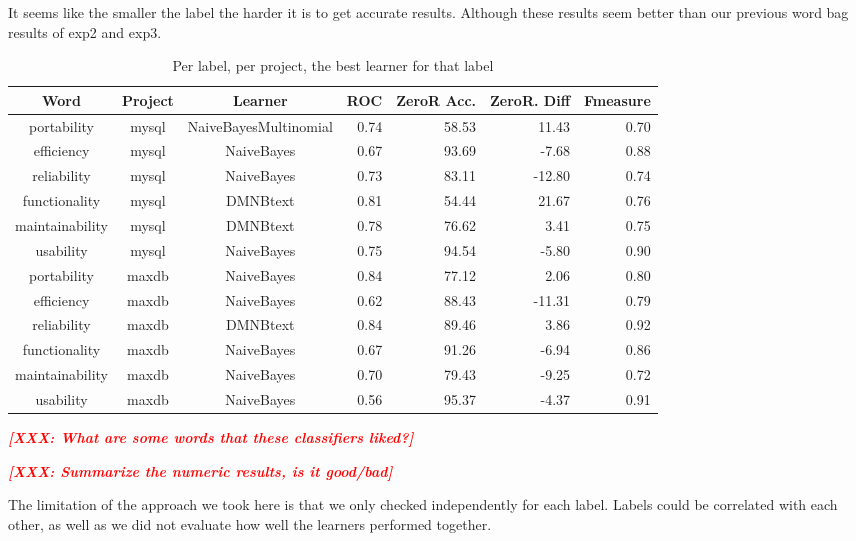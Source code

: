 \documentclass{acm_proc_article-sp}
\newcommand{\XXX}[1]{\textcolor{red}{{\it \textbf{[XXX: #1]}}}}
\begin{document}
It seems like the smaller the label the harder it is to get accurate results. Although these results seem better than our previous word bag results of \textsf{exp2} and \textsf{exp3}.


\begin{table*}
\begin{tabular}{ccc|rrrr}
Word & Project & Learner & ROC & ZeroR Acc. & ZeroR. Diff & Fmeasure\\
\hline
portability &  mysql &  NaiveBayesMultinomial &  0.74 &  58.53 &  11.43 &  0.70  \\ 
efficiency &  mysql &  NaiveBayes &  0.67 &  93.69 &  -7.68 &  0.88 \\ 
reliability &  mysql &  NaiveBayes &  0.73 &  83.11 &  -12.80 &  0.74 \\ 
functionality &  mysql &  DMNBtext &  0.81 &  54.44 &  21.67 &  0.76 \\ 
maintainability &  mysql &  DMNBtext &  0.78 &  76.62 &  3.41 &  0.75 \\ 
usability &  mysql &  NaiveBayes &  0.75 &  94.54 &  -5.80 &  0.90  \\ 
 \hline 
portability &  maxdb &  NaiveBayes &  0.84 &  77.12 &  2.06 &  0.80 \\ 
efficiency &  maxdb &  NaiveBayes &  0.62 &  88.43 &  -11.31 &  0.79 \\ 
reliability &  maxdb &  DMNBtext &  0.84 &  89.46 &  3.86 &  0.92  \\ 
functionality &  maxdb &  NaiveBayes &  0.67 &  91.26 &  -6.94 &  0.86  \\ 
maintainability &  maxdb &  NaiveBayes &  0.70 &  79.43 &  -9.25 &  0.72  \\ 
usability &  maxdb &  NaiveBayes &  0.56 &  95.37 &  -4.37 &  0.91  \\ 
 \hline 
\end{tabular}
\caption{Per label, per project, the best learner for that label}
\label{tab:best-learner-per-tag}
\end{table*}

\XXX{What are some words that these classifiers liked?}

\XXX{Summarize the numeric results, is it good/bad}

The limitation of the approach we took here is that we only checked independently for each label. Labels could be correlated with each other, as well as we did not evaluate how well the learners performed together.
\end{document}

